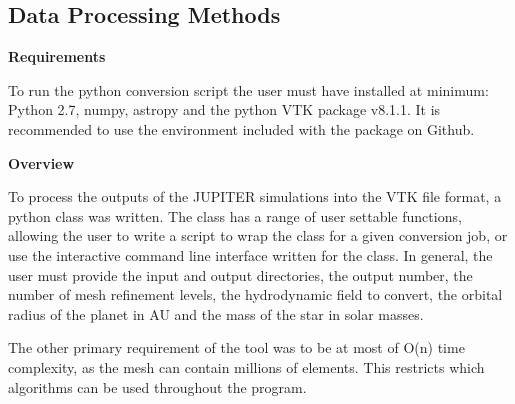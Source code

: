 \documentclass[preprint2]{aastex62}
\begin{document}
\subsection{Data Processing Methods}\label{sec:proc}
\textbf{Requirements}

To run the python conversion script the user must have installed at minimum: Python 2.7, numpy, astropy and the python VTK package v8.1.1. 
It is recommended to use the environment included with the package on Github.

\textbf{Overview}

To process the outputs of the JUPITER simulations into the VTK file format, a python class was written. 
The class has a range of user settable functions, allowing the user to write a script to wrap the class for a given conversion job, or use the interactive command line interface written for the class.
In general, the user must provide the input and output directories, the output number, the number of mesh refinement levels, the hydrodynamic field to convert, the orbital radius of the planet in AU and the mass of the star in solar masses.

The other primary requirement of the tool was to be at most of O(n) time complexity, as the mesh can contain millions of elements. This restricts which algorithms can be used throughout the program.
\end{document}
